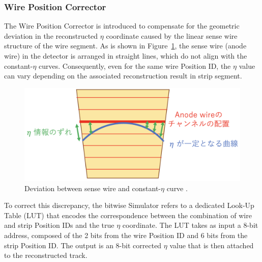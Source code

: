 \subsubsection{Wire Position Corrector}

The Wire Position Corrector is introduced to compensate for the geometric deviation in the reconstructed \(\eta\) coordinate caused by the linear sense wire structure of the wire segment. As is shown in Figure~\ref{fig:wire_corr}, the sense wire (anode wire) in the detector is arranged in straight lines, which do not align with the constant-\(\eta\) curves. Consequently, even for the same wire Position ID, the \(\eta\) value can vary depending on the associated reconstruction result in strip segment.

\begin{figure}[htbp]
  \centering
  \includegraphics[width=1.0\textwidth]{figs/chapter5/wire_corr.png}
  \caption{Deviation between sense wire and constant-\(\eta\) curve \cite{yamashita}.}
  \label{fig:wire_corr}
\end{figure}

To correct this discrepancy, the bitwise Simulator refers to a dedicated Look-Up Table (LUT) that encodes the correspondence between the combination of wire and strip Position IDs and the true \(\eta\) coordinate. The LUT takes as input a 8-bit address, composed of the 2 bits from the wire Position ID and 6 bits from the strip Position ID. The output is an 8-bit corrected \(\eta\) value that is then attached to the reconstructed track.

